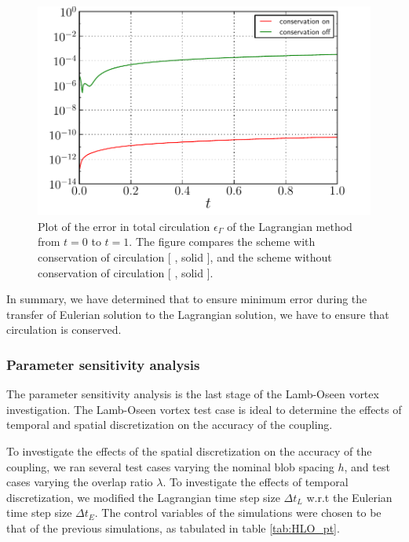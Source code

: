 	\begin{figure}[!h]
	\centering
	\includegraphics[width=0.6\linewidth]{./figures/hybrid/lambOseent2/lambOseen_comparision_conservation_circulation_compressed.pdf}
	\caption{Plot of the error in total circulation $\epsilon_{\Gamma}$ of the Lagrangian method from $t=0$ to $t=1$. The figure compares the scheme with conservation of circulation [ {\color{plotRed}{\textbf{---}}}, solid {}], and the scheme without conservation of circulation [ {\color{plotGreen}{\textbf{---}}}, solid {}].}
	\label{fig:lambOseen_comparision_conservation_circulation}
	\end{figure}	

In summary, we have determined that to ensure minimum error during the transfer of Eulerian solution to the Lagrangian solution, we have to ensure that circulation is conserved.

\subsubsection{Parameter sensitivity analysis}
\label{subsubsec:psa}

The parameter sensitivity analysis is the last stage of the Lamb-Oseen vortex investigation. The Lamb-Oseen vortex test case is ideal to determine the effects of temporal and spatial discretization on the accuracy of the coupling. 

To investigate the effects of the spatial discretization on the accuracy of the coupling, we ran several test cases varying the nominal blob spacing $h$, and test cases varying the overlap ratio $\lambda$. To investigate the effects of temporal discretization, we modified the Lagrangian time step size $\Delta t_L$ w.r.t the Eulerian time step size $\Delta t_E$. The control variables of the simulations were chosen to be that of the previous simulations, as tabulated in table \ref{tab:HLO_pt}.

